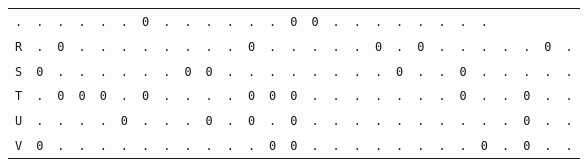 \begin{figure}[H]
\begin{center}
{\begin{tabular}{c|cccccccccccccccccccccccccc}
				\texttt{.} & \texttt{.} & \texttt{.} & \texttt{.} &
				\texttt{.} & \texttt{.} & \texttt{0} & \texttt{.} &
				\texttt{.} & \texttt{.} & \texttt{.} & \texttt{.} &
				\texttt{.} & \texttt{0} & \texttt{0} & \texttt{.} &
				\texttt{.} & \texttt{.} & \texttt{.} & \texttt{.} &
				\texttt{.} & \texttt{.} & \texttt{.}                             \\
				\texttt{R} & \texttt{.} & \texttt{0} & \texttt{.} &
				\texttt{.} & \texttt{.} & \texttt{.} & \texttt{.} &
				\texttt{.} & \texttt{.} & \texttt{.} & \texttt{0} &
				\texttt{.} & \texttt{.} & \texttt{.} & \texttt{.} &
				\texttt{.} & \texttt{0} & \texttt{.} & \texttt{0} &
				\texttt{.} & \texttt{.} & \texttt{.} & \texttt{.} &
				\texttt{.} & \texttt{0} & \texttt{.}                             \\
				\texttt{S} & \texttt{0} & \texttt{.} & \texttt{.} &
				\texttt{.} & \texttt{.} & \texttt{.} & \texttt{.} &
				\texttt{0} & \texttt{0} & \texttt{.} & \texttt{.} &
				\texttt{.} & \texttt{.} & \texttt{.} & \texttt{.} &
				\texttt{.} & \texttt{.} & \texttt{0} & \texttt{.} &
				\texttt{.} & \texttt{0} & \texttt{.} & \texttt{.} &
				\texttt{.} & \texttt{.} & \texttt{.}                             \\
				\texttt{T} & \texttt{.} & \texttt{0} & \texttt{0} &
				\texttt{0} & \texttt{.} & \texttt{0} & \texttt{.} &
				\texttt{.} & \texttt{.} & \texttt{.} & \texttt{0} &
				\texttt{0} & \texttt{0} & \texttt{.} & \texttt{.} &
				\texttt{.} & \texttt{.} & \texttt{.} & \texttt{.} &
				\texttt{.} & \texttt{0} & \texttt{.} & \texttt{.} &
				\texttt{0} & \texttt{.} & \texttt{.}                             \\
				\texttt{U} & \texttt{.} & \texttt{.} & \texttt{.} &
				\texttt{.} & \texttt{0} & \texttt{.} & \texttt{.} &
				\texttt{.} & \texttt{0} & \texttt{.} & \texttt{0} &
				\texttt{.} & \texttt{0} & \texttt{.} & \texttt{.} &
				\texttt{.} & \texttt{.} & \texttt{.} & \texttt{.} &
				\texttt{.} & \texttt{.} & \texttt{.} & \texttt{.} &
				\texttt{0} & \texttt{.} & \texttt{.}                             \\
				\texttt{V} & \texttt{0} & \texttt{.} & \texttt{.} &
				\texttt{.} & \texttt{.} & \texttt{.} & \texttt{.} &
				\texttt{.} & \texttt{.} & \texttt{.} & \texttt{.} &
				\texttt{0} & \texttt{0} & \texttt{.} & \texttt{.} &
				\texttt{.} & \texttt{.} & \texttt{.} & \texttt{.} &
				\texttt{.} & \texttt{.} & \texttt{0} & \texttt{.} &
				\texttt{0} & \texttt{.} & \texttt{.}                             \\

\end{tabular}}
\end{center}
\end{figure}
